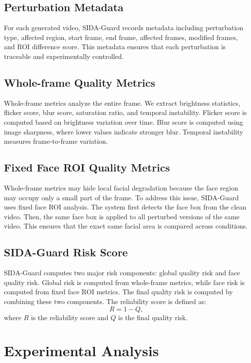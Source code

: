 \documentclass[conference]{IEEEtran}
\begin{document}
\subsection{Perturbation Metadata}
For each generated video, SIDA-Guard records metadata including perturbation type, affected region, start frame, end frame, affected frames, modified frames, and ROI difference score. This metadata ensures that each perturbation is traceable and experimentally controlled.

\subsection{Whole-frame Quality Metrics}
Whole-frame metrics analyze the entire frame. We extract brightness statistics, flicker score, blur score, saturation ratio, and temporal instability. Flicker score is computed based on brightness variation over time. Blur score is computed using image sharpness, where lower values indicate stronger blur. Temporal instability measures frame-to-frame variation.

\subsection{Fixed Face ROI Quality Metrics}
Whole-frame metrics may hide local facial degradation because the face region may occupy only a small part of the frame. To address this issue, SIDA-Guard uses fixed face ROI analysis. The system first detects the face box from the clean video. Then, the same face box is applied to all perturbed versions of the same video. This ensures that the exact same facial area is compared across conditions.

\subsection{SIDA-Guard Risk Score}
SIDA-Guard computes two major risk components: global quality risk and face quality risk. Global risk is computed from whole-frame metrics, while face risk is computed from fixed face ROI metrics. The final quality risk is computed by combining these two components. The reliability score is defined as:
\begin{equation}
R = 1 - Q,
\end{equation}
where $R$ is the reliability score and $Q$ is the final quality risk.

\section{Experimental Analysis}
\end{document}
